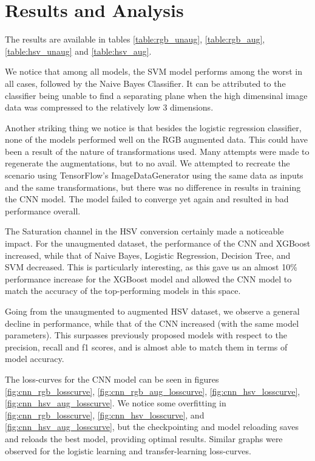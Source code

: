\documentclass[10pt,twocolumn,letterpaper]{article}
\begin{document}
\section{Results and Analysis}
The results are available in tables \ref{table:rgb_unaug}, \ref{table:rgb_aug}, \ref{table:hsv_unaug} and \ref{table:hsv_aug}.

We notice that among all models, the SVM model performs among the worst in all cases, followed by the Naive Bayes Classifier. It can be attributed to the classifier being unable to find a separating plane when the high dimensinal image data was compressed to the relatively low 3 dimensions.

Another striking thing we notice is that besides the logistic regression classifier, none of the models performed well on the RGB augmented data. This could have been a result of the nature of transformations used. Many attempts were made to regenerate the augmentations, but to no avail. We attempted to recreate the scenario using TensorFlow's ImageDataGenerator using the same data as inputs and the same transformations, but there was no difference in results in training the CNN model. The model failed to converge yet again and resulted in bad performance overall.

The Saturation channel in the HSV conversion certainly made a noticeable impact. For the unaugmented dataset, the performance of the CNN and XGBoost increased, while that of Naive Bayes, Logistic Regression, Decision Tree, and SVM decreased. This is particularly interesting, as this gave us an almost 10\% performance increase for the XGBoost model and allowed the CNN model to match the accuracy of the top-performing models in this space.

Going from the unaugmented to augmented HSV dataset, we observe a general decline in performance, while that of the CNN increased (with the same model parameters). This surpasses previously proposed models with respect to the precision, recall and f1 scores, and is almost able to match them in terms of model accuracy.

The loss-curves for the CNN model can be seen in figures \ref{fig:cnn_rgb_losscurve}, \ref{fig:cnn_rgb_aug_losscurve}, \ref{fig:cnn_hsv_losscurve}, \ref{fig:cnn_hsv_aug_losscurve}. We notice some overfitting in \ref{fig:cnn_rgb_losscurve}, \ref{fig:cnn_hsv_losscurve}, and \ref{fig:cnn_hsv_aug_losscurve}, but the checkpointing and model reloading saves and reloads the best model, providing optimal results. Similar graphs were observed for the logistic learning and transfer-learning loss-curves.
\end{document}
